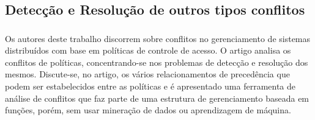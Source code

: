 \subsection{Detecção e Resolução de outros tipos conflitos}\label{trab:rel-conflitos}
\subsubsection{}
Os autores deste trabalho discorrem sobre conflitos no gerenciamento de sistemas distribuídos com base em políticas de controle de acesso. O artigo analisa os conflitos de políticas, concentrando-se nos problemas de detecção e resolução dos mesmos. Discute-se, no artigo, os vários relacionamentos de precedência que podem ser estabelecidos entre as políticas e é apresentado uma ferramenta de análise de conflitos que faz parte de uma estrutura de gerenciamento baseada em funções, porém, sem usar mineração de dados ou aprendizagem de máquina.


